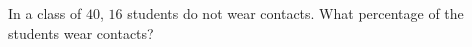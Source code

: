 In a class of $40$, $16$ students do not wear contacts. What percentage of the students wear contacts?
